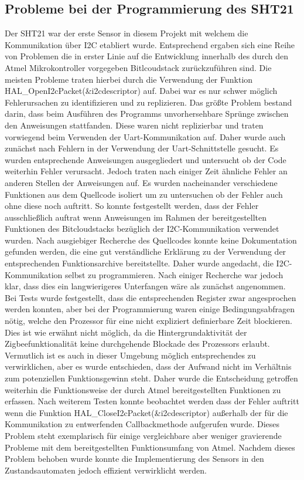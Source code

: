 \documentclass[]{article}
\begin{document}
		\subsection{Probleme bei der Programmierung des SHT21}
		Der SHT21 war der erste Sensor in diesem Projekt mit welchem die Kommunikation über I2C etabliert wurde. Entsprechend ergaben sich eine Reihe von Problemen die in erster Linie auf die Entwicklung innerhalb des durch den Atmel Mikrokontroller vorgegeben Bitlcoudstack zurückzuführen sind. Die meisten Probleme traten hierbei durch die Verwendung der Funktion HAL\_OpenI2cPacket(\&i2cdescriptor) auf. Dabei war es nur schwer möglich Fehlerursachen zu identifizieren und zu replizieren. Das größte Problem bestand darin, dass beim Ausführen des Programms unvorhersehbare Sprünge zwischen den Anweisungen stattfanden. Diese waren nicht replizierbar und traten vorwiegend beim Verwenden der Uart-Kommunikation auf. Daher wurde auch zunächst nach Fehlern in der Verwendung der Uart-Schnittstelle gesucht. Es wurden entsprechende Anweisungen ausgegliedert und untersucht ob der Code weiterhin Fehler verursacht. Jedoch traten nach einiger Zeit ähnliche Fehler an anderen Stellen der Anweisungen auf. Es wurden nacheinander verschiedene Funktionen aus dem Quellcode isoliert um zu untersuchen ob der Fehler auch ohne diese noch auftritt. So konnte festgestellt werden, dass der Fehler ausschließlich auftrat wenn Anweisungen im Rahmen der bereitgestellten Funktionen des Bitcloudstacks bezüglich der I2C-Kommunikation verwendet wurden. Nach ausgiebiger Recherche des Quellcodes konnte keine Dokumentation gefunden werden, die eine gut verständliche Erklärung zu der Verwendung der entsprechenden Funktionsarchive bereitstellte. Daher wurde angedacht, die I2C-Kommunikation selbst zu programmieren. Nach einiger Recherche war jedoch klar, dass dies ein langwierigeres Unterfangen wäre als zunächst angenommen. Bei Tests wurde festgestellt, dass die entsprechenden Register zwar angesprochen werden konnten, aber bei der Programmierung waren einige Bedingungsabfragen nötig, welche den Prozessor für eine nicht expliziert definierbare Zeit blockieren. Dies ist wie erwähnt nicht möglich, da die Hintergrundaktivität der Zigbeefunktionalität keine durchgehende Blockade des Prozessors erlaubt. Vermutlich ist es auch in dieser Umgebung möglich entsprechendes zu verwirklichen, aber es wurde entschieden, dass der Aufwand nicht im Verhältnis zum potenziellen Funktionsgewinn steht. Daher wurde die Entscheidung getroffen weiterhin die Funktionsweise der durch Atmel bereitgestellten Funktionen zu erfassen. Nach weiterem Testen konnte beobachtet werden dass der Fehler auftritt wenn die Funktion HAL\_CloseI2cPacket(\&i2cdescriptor) außerhalb der für die Kommunikation zu entwerfenden Callbackmethode aufgerufen wurde. Dieses Problem steht exemplarisch für einige vergleichbare aber weniger gravierende Probleme mit dem bereitgestellten Funktionsumfang von Atmel. Nachdem dieses Problem behoben wurde konnte die Implementierung des Sensors in den Zustandsautomaten jedoch effizient verwirklicht werden. 
		
\end{document}
